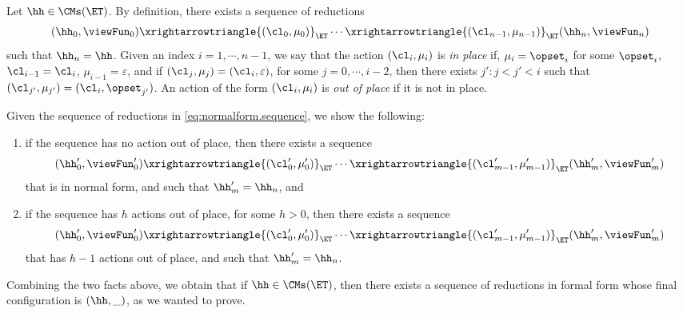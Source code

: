 Let $\hh \in \CMs(\ET)$. By definition, there exists a sequence of reductions 
\begin{equation}
\label{eq:normalform.sequence}
(\hh_{0}, \viewFun_{0}) \xrightarrowtriangle{(\cl_0, \mu_0)}_{\ET} \cdots \xrightarrowtriangle{(\cl_{n-1}, \mu_{n-1})}_{\ET} (\hh_n, \viewFun_{n})
\end{equation}
such that $\hh_{n} = \hh$. Given an index $i = 1,\cdots, n-1$, we say that the action $(\cl_{i}, \mu_{i})$ is \emph{in place} 
if, $\mu_{i} = \opset_{i}$ for some $\opset_{i}$, $\cl_{i-1} = \cl_{i}$, $\mu_{i-1} = \varepsilon$, and if $(\cl_{j}, \mu_{j}) = (\cl_{i}, \varepsilon)$, 
for some  $j = 0,\cdots, i-2$, then there exists $j': j < j' < i$ such that $(\cl_{j'}, \mu_{j'}) = (\cl_i, \opset_{j'})$. An action of the 
form $(\cl_{i}, \mu_{i})$ is \emph{out of place} if it is not in place. 

Given the sequence of reductions in \cref{eq:normalform.sequence}, we show the following: 
\begin{enumerate}
\item if the sequence has no action out of place, then there exists a sequence 
\[
(\hh'_{0}, \viewFun'_{0}) \xrightarrowtriangle{(\cl'_{0}, \mu'_{0})}_{\ET} \cdots \xrightarrowtriangle{(\cl'_{m-1}, \mu'_{m-1})}_{\ET} (\hh'_{m}, \viewFun'_{m})
\]
that is in normal form, and such that $\hh'_{m} = \hh_{n}$, and 
\item if the sequence has $h$ actions out of place, for some $h > 0$, then there exists a sequence 
\[
(\hh'_{0}, \viewFun'_{0}) \xrightarrowtriangle{(\cl'_{0}, \mu'_{0})}_{\ET} \cdots \xrightarrowtriangle{(\cl'_{m-1}, \mu'_{m-1})}_{\ET} (\hh'_{m}, \viewFun'_{m})
\]
that has $h-1$ actions out of place, and such that $\hh'_{m} = \hh_{n}$.
\end{enumerate}
Combining the two facts above, we obtain that if $\hh \in \CMs(\ET)$, then there exists a sequence of reductions in formal form whose final 
configuration is $(\hh, \_)$, as we wanted to prove.

